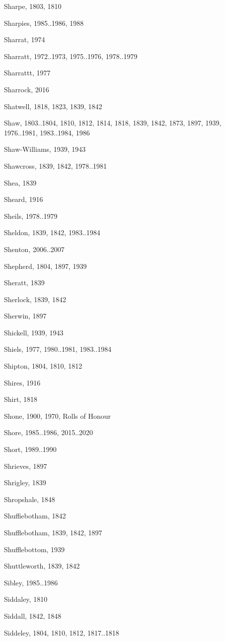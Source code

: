 {\begin{theindex}
\item Sharpe, 1803, 1810
\item Sharpies, 1985..1986, 1988
\item Sharrat, 1974
\item Sharratt, 1972..1973, 1975..1976, 1978..1979
\item Sharrattt, 1977
\item Sharrock, 2016
\item Shatwell, 1818, 1823, 1839, 1842
\item Shaw, 1803..1804, 1810, 1812, 1814, 1818, 1839, 1842, 1873, 1897, 1939, 1976..1981, 1983..1984, 1986
\item Shaw-Williams, 1939, 1943
\item Shawcross, 1839, 1842, 1978..1981
\item Shea, 1839
\item Sheard, 1916
\item Sheils, 1978..1979
\item Sheldon, 1839, 1842, 1983..1984
\item Shenton, 2006..2007
\item Shepherd, 1804, 1897, 1939
\item Sheratt, 1839
\item Sherlock, 1839, 1842
\item Sherwin, 1897
\item Shickell, 1939, 1943
\item Shiels, 1977, 1980..1981, 1983..1984
\item Shipton, 1804, 1810, 1812
\item Shires, 1916
\item Shirt, 1818
\item Shone, 1900, 1970, Rolls of Honour
\item Shore, 1985..1986, 2015..2020
\item Short, 1989..1990
\item Shrieves, 1897
\item Shrigley, 1839
\item Shropshale, 1848
\item Shuffiebotham, 1842
\item Shufflebotham, 1839, 1842, 1897
\item Shufflebottom, 1939
\item Shuttleworth, 1839, 1842
\item Sibley, 1985..1986
\item Siddaley, 1810
\item Siddall, 1842, 1848
\item Siddeley, 1804, 1810, 1812, 1817..1818

\end{theindex}}
